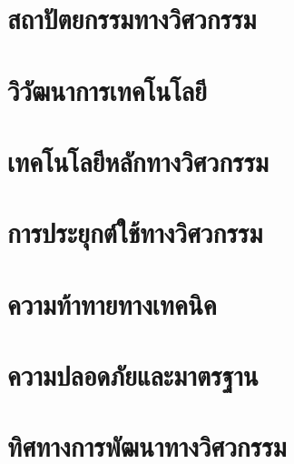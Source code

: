 \documentclass[a4paper]{article}
\begin{document}
\section{สถาปัตยกรรมทางวิศวกรรม}
\begin{justify}
\end{justify}

\section{วิวัฒนาการเทคโนโลยี}
\begin{justify}
\end{justify}

\section{เทคโนโลยีหลักทางวิศวกรรม}
\begin{justify}
\end{justify}

\section{การประยุกต์ใช้ทางวิศวกรรม}
\begin{justify}
\end{justify}

\section{ความท้าทายทางเทคนิค}
\begin{justify}
\end{justify}

\section{ความปลอดภัยและมาตรฐาน}
\begin{justify}
\end{justify}

\section{ทิศทางการพัฒนาทางวิศวกรรม}
\begin{justify}
\end{justify}
\end{document}
